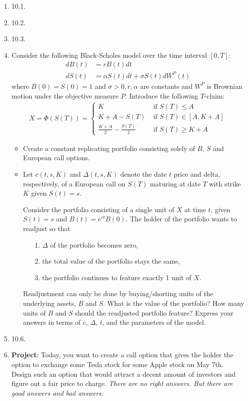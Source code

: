 \documentclass[12pt]{article}
\renewcommand{\a}{\alpha}
\newcommand{\s}{\sigma}
\newcommand{\D}{\Delta}
\begin{document}
\begin{enumerate}
  \item 10.1.
  \item 10.2.
  \item 10.3.
  \item Consider the following Black-Scholes model over the time interval $[0, T]$:
\begin{align*}
dB(t)		& = r B(t) dt\\
dS(t)		& = \a S(t) dt + \s S(t) dW^P(t)
\end{align*}
where $B(0) = S(0) = 1$ and $\s > 0, r, \a$ are constants and $W^P$ is Brownian motion under the objective measure $P$. Introduce the following $T$-claim:
\begin{align*}
X = \Phi(S(T)) = 
\begin{cases}
K						& \mbox{\ \ \ \ if $S(T) \leq A$}\\
K+A - S(T)				& \mbox{\ \ \ \ if $S(T) \in [A, K+A]$}\\
\frac{K+A}{2} - \frac{S(T)}{2}	& \mbox{\ \ \ \ if $S(T) \geq K+A$}
\end{cases}
\end{align*}
  \begin{itemize}
    \item Create a constant replicating portfolio consisting solely of $B$, $S$ and European call options.
    \item Let $c(t, s, K)$ and $\D(t, s, K)$ denote the date $t$ price and delta, respectively, of a European call on $S(T)$ maturing at date $T$ with strike $K$ given $S(t) = s$.

Consider the portfolio consisting of a single unit of $X$ at time $t$, given $S(t) = s$ and $B(t) = e^{rt} B(0)$. The holder of the portfolio wants to readjust so that
\begin{itemize}
  \item[1.] $\D$ of the portfolio becomes zero,
  \item[2.] the total value of the portfolio stays the same,
  \item[3.] the portfolio continues to feature exactly 1 unit of $X$.
\end{itemize}

Readjustment can only be done by buying/shorting units of the underlying assets, $B$ and $S$. What is the value of the portfolio? How many units of $B$ and $S$ should the readjusted portfolio feature? Express your answers in terms of $c$, $\D$, $t$, and the parameters of the model.
  \end{itemize}
  \item 10.6.
  \item \textbf{Project}: Today, you want to create a call option that gives the holder the option to exchange some Tesla stock for some Apple stock on May 7th. Design such an option that would attract a decent amount of investors and figure out a fair price to charge. \emph{There are no right answers. But there are good answers and bad answers.}
\end{enumerate}
\end{document}
